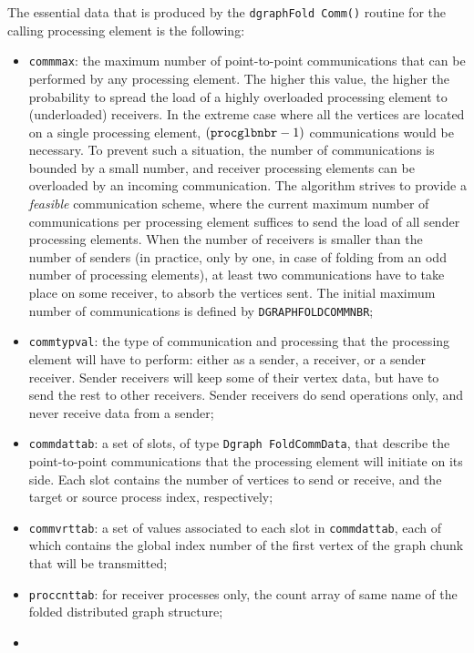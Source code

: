 The essential data that is produced by the \texttt{dgraph\lbt Fold\lbt
Comm()} routine for the calling processing element is the following:
\begin{itemize}
\item
\texttt{commmax}: the maximum number of point-to-point communications
that can be performed by any processing element. The higher this
value, the higher the probability to spread the load of a highly
overloaded processing element to (underloaded) receivers. In the
extreme case where all the vertices are located on a single processing
element, $(\mbox{\texttt{procglbnbr}} - 1)$ communications would be
necessary. To prevent such a situation, the number of communications
is bounded by a small number, and receiver processing elements can be
overloaded by an incoming communication. The algorithm strives to
provide a \textit{feasible} communication scheme, where the current
maximum number of communications per processing element suffices to
send the load of all sender processing elements. When the number of
receivers is smaller than the number of senders (in practice, only by
one, in case of folding from an odd number of processing elements), at
least two communications have to take place on some receiver, to
absorb the vertices sent. The initial maximum number of communications
is defined by \texttt{DGRAPH\lbt FOLD\lbt COMM\lbt NBR};
\item
\texttt{commtypval}: the type of communication and processing that
the processing element will have to perform: either as a sender, a
receiver, or a sender receiver. Sender receivers will keep some of
their vertex data, but have to send the rest to other
receivers. Sender receivers do send operations only, and never receive
data from a sender;
\item
\texttt{commdattab}: a set of slots, of type \texttt{Dgraph\lbt
Fold\lbt Comm\lbt Data}, that describe the point-to-point
communications that the processing element will initiate on its
side. Each slot contains the number of vertices to send or receive,
and the target or source process index, respectively;
\item
\texttt{commvrttab}: a set of values associated to each slot in
\texttt{comm\lbt dat\lbt tab}, each of which contains the global index
number of the first vertex of the graph chunk that will be
transmitted;
\item
\texttt{proccnttab}: for receiver processes only, the count array of
same name of the folded distributed graph structure;
\item

\end{itemize}
